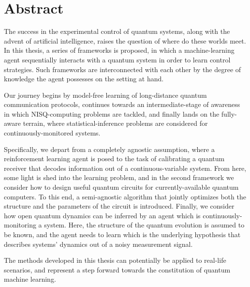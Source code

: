 \chapter*{Abstract}
The success in the experimental control of quantum systems, along with the advent of artificial intelligence, raises the question of where do these worlds meet. In this thesis, a series of frameworks is proposed, in which a machine-learning agent sequentially interacts with a quantum system in order to learn control strategies. Such frameworks are interconnected with each other by the degree of knowledge the agent possesses on the setting at hand.

Our journey begins by model-free learning of long-distance quantum communication protocols, continues towards an intermediate-stage of awareness in which NISQ-computing problems are tackled, and finally lands on the fully-aware terrain, where statistical-inference problems are considered for continuously-monitored systems.

Specifically, we depart from a completely agnostic assumption, where a reinforcement learning agent is posed to the task of calibrating a quantum receiver that decodes information out of a continuous-variable system. From here, some light is shed into the learning problem, and in the second framework we consider how to design useful quantum circuits for currently-available quantum computers. To this end, a semi-agnostic algorithm that jointly optimizes both the structure and the parameters of the circuit is introduced. Finally, we consider how open quantum dynamics can be inferred by an agent which is continuously-monitoring a system. Here, the structure of the quantum evolution is assumed to be known, and the agent needs to learn which is the underlying hypothesis that describes systems’ dynamics out of a noisy measurement signal.

The methods developed in this thesis can potentially be applied to real-life scenarios, and represent a step forward towards the constitution of quantum machine learning.
